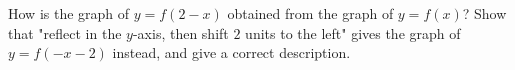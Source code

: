 How is the graph of $y=f(2-x)$ obtained from the graph of $y=f(x)$? Show that "reflect in the $y$-axis, then shift $2$ units to the left" gives the graph of $y=f(-x-2)$ instead, and give a correct description.
